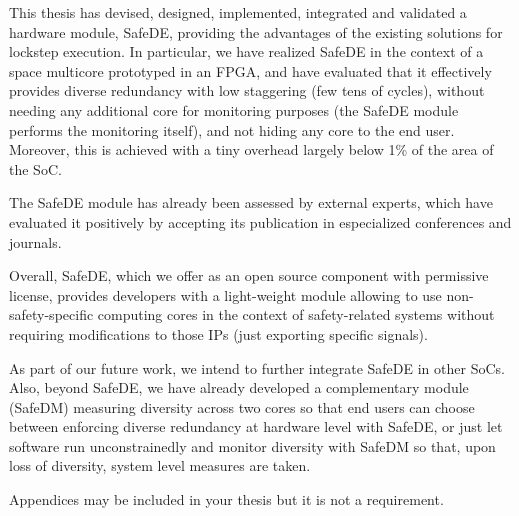 \documentclass[a4paper,12pt]{article}
\begin{document}
This thesis has devised, designed, implemented, integrated and validated a hardware module, SafeDE, providing the advantages of the existing solutions for lockstep execution. In particular, we have realized SafeDE in the context of a space multicore prototyped in an FPGA, and have evaluated that it effectively provides diverse redundancy with low staggering (few tens of cycles), without needing any additional core for monitoring purposes (the SafeDE module performs the monitoring itself), and not hiding any core to the end user. Moreover, this is achieved with a tiny overhead largely below 1\% of the area of the SoC. 

The SafeDE module has already been assessed by external experts, which have evaluated it positively by accepting its publication in especialized conferences and journals.

Overall, SafeDE, which we offer as an open source component with permissive license, provides developers with a light-weight module allowing to use non-safety-specific computing cores in the context of safety-related systems without requiring modifications to those IPs (just exporting specific signals). 

As part of our future work, we intend to further integrate SafeDE in other SoCs. Also, beyond SafeDE, we have already developed a complementary module (SafeDM) measuring diversity across two cores so that end users can choose between enforcing diverse redundancy at hardware level with SafeDE, or just let software run unconstrainedly and monitor diversity with SafeDM so that, upon loss of diversity, system level measures are taken. 

\newpage

\medskip



\clearpage
\newpage

\begin{appendices}

{Appendices may be included in your thesis but it is not a requirement.}

\end{appendices}
\end{document}
